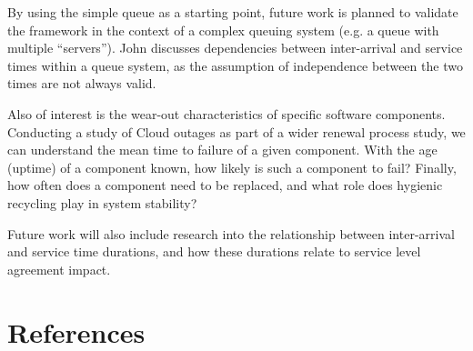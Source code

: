 \documentclass[5p]{elsarticle}
\begin{document}
By using the simple queue as a starting point, future work is planned to validate the framework in the context of a complex queuing system (e.g. a queue with multiple ``servers''). John \cite{john1963single} discusses dependencies between inter-arrival and service times within a queue system, as the assumption of independence between the two times are not always valid.

Also of interest is the wear-out characteristics of specific software components. Conducting a study of Cloud outages as part of a wider renewal process study, we can understand the mean time to failure of a given component.  With the age (uptime) of a component known, how likely is such a component to fail? Finally, how often does a component need to be replaced, and what role does hygienic recycling play in system stability?

Future work will also include research into the relationship between inter-arrival and service time durations, and how these durations relate to service level agreement impact.


\section*{References}


\end{document}

